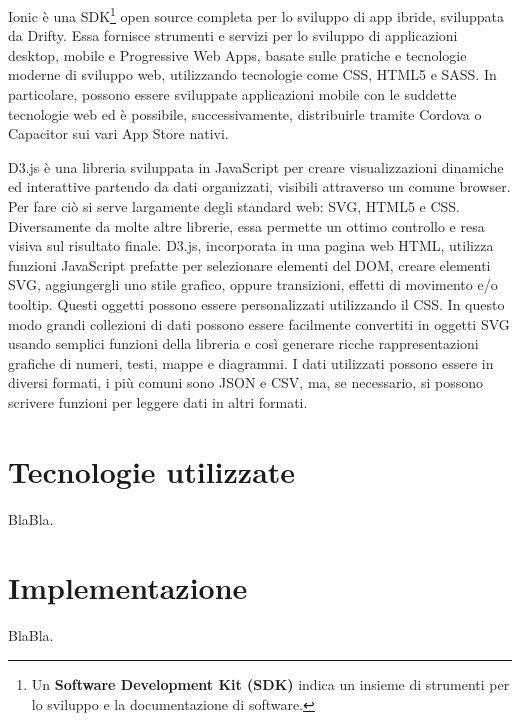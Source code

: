 Ionic \`{e} una SDK\footnote{Un \textbf{Software Development Kit (SDK)} indica un insieme di strumenti per lo sviluppo e la documentazione di software.} open source completa per lo sviluppo di app ibride, sviluppata da Drifty. Essa fornisce strumenti e servizi per lo sviluppo di applicazioni desktop, mobile e Progressive Web Apps, basate sulle pratiche e tecnologie moderne di sviluppo web, utilizzando tecnologie come CSS, HTML5 e SASS. In particolare, possono essere sviluppate applicazioni mobile con le suddette tecnologie web ed \`{e} possibile, successivamente, distribuirle tramite Cordova o Capacitor sui vari App Store nativi.\par
D3.js \`{e} una libreria sviluppata in JavaScript per creare visualizzazioni dinamiche ed interattive partendo da dati organizzati, visibili attraverso un comune browser. Per fare ci\`{o} si serve largamente degli standard web: SVG, HTML5 e CSS. Diversamente da molte altre librerie, essa permette un ottimo controllo e resa visiva sul risultato finale. D3.js, incorporata in una pagina web HTML, utilizza funzioni JavaScript prefatte per selezionare elementi del DOM, creare elementi SVG, aggiungergli uno stile grafico, oppure transizioni, effetti di movimento e/o tooltip. Questi oggetti possono essere personalizzati utilizzando il CSS. In questo modo grandi collezioni di dati possono essere facilmente convertiti in oggetti SVG usando semplici funzioni della libreria e cos\`{i} generare ricche rappresentazioni grafiche di numeri, testi, mappe e diagrammi. I dati utilizzati possono essere in diversi formati, i pi\`{u} comuni sono JSON e CSV, ma, se necessario, si possono scrivere funzioni per leggere dati in altri formati.

\section{Tecnologie utilizzate}
BlaBla.

\section{Implementazione}
BlaBla.

